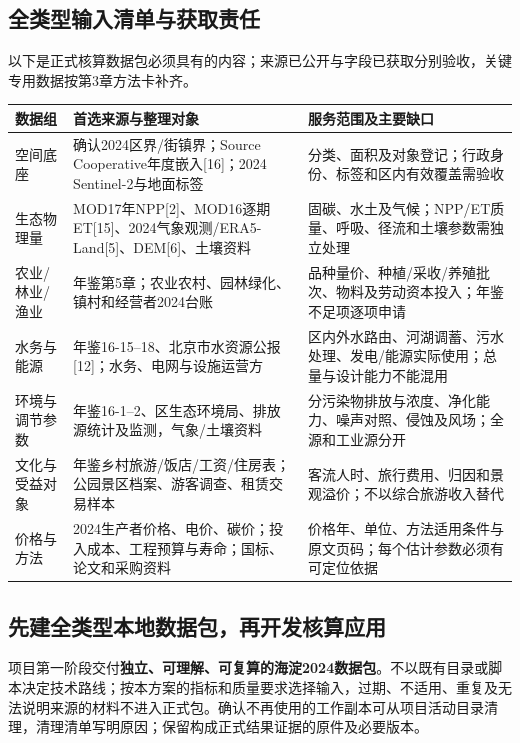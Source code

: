 \documentclass[12pt,a4paper,fontset=fandol]{ctexart}
\begin{document}
\subsection{全类型输入清单与获取责任}
以下是正式核算数据包必须具有的内容；来源已公开与字段已获取分别验收，关键专用数据按第3章方法卡补齐。
{\small
\begin{longtable}{P{2.1cm}P{5.5cm}P{5.4cm}}
\toprule 数据组 & 首选来源与整理对象 & 服务范围及主要缺口 \\\midrule\endhead
空间底座 & 确认2024区界/街镇界；Source Cooperative年度嵌入[16]；2024 Sentinel-2与地面标签 & 分类、面积及对象登记；行政身份、标签和区内有效覆盖需验收 \\
生态物理量 & MOD17年NPP[2]、MOD16逐期ET[15]、2024气象观测/ERA5-Land[5]、DEM[6]、土壤资料 & 固碳、水土及气候；NPP/ET质量、呼吸、径流和土壤参数需独立处理 \\
农业/林业/渔业 & 年鉴第5章；农业农村、园林绿化、镇村和经营者2024台账 & 品种量价、种植/采收/养殖批次、物料及劳动资本投入；年鉴不足项逐项申请 \\
水务与能源 & 年鉴16-15--18、北京市水资源公报[12]；水务、电网与设施运营方 & 区内外水路由、河湖调蓄、污水处理、发电/能源实际使用；总量与设计能力不能混用 \\
环境与调节参数 & 年鉴16-1--2、区生态环境局、排放源统计及监测，气象/土壤资料 & 分污染物排放与浓度、净化能力、噪声对照、侵蚀及风场；全源和工业源分开 \\
文化与受益对象 & 年鉴乡村旅游/饭店/工资/住房表；公园景区档案、游客调查、租赁交易样本 & 客流人时、旅行费用、归因和景观溢价；不以综合旅游收入替代 \\
价格与方法 & 2024生产者价格、电价、碳价；投入成本、工程预算与寿命；国标、论文和采购资料 & 价格年、单位、方法适用条件与原文页码；每个估计参数必须有可定位依据 \\
\bottomrule
\end{longtable}}

\subsection{先建全类型本地数据包，再开发核算应用}\label{sec:newdata}
项目第一阶段交付\textbf{独立、可理解、可复算的海淀2024数据包}。不以既有目录或脚本决定技术路线；按本方案的指标和质量要求选择输入，过期、不适用、重复及无法说明来源的材料不进入正式包。确认不再使用的工作副本可从项目活动目录清理，清理清单写明原因；保留构成正式结果证据的原件及必要版本。
\end{document}
